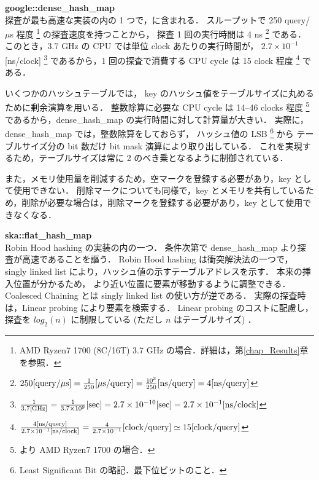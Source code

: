 {\bf google::dense\_hash\_map}
\samepage \\ \indent
探査が最も高速な実装の内の 1 つで，\cite{sparsehash2005}に含まれる．
スループットで 250 query/$\mu$s 程度
\footnote{AMD Ryzen7 1700 (8C/16T) 3.7 GHz の場合．詳細は，第\ref{chap_Results}章を参照．}
の探査速度を持つことから，
探査 1 回の実行時間は 4 ns
\footnote{
  $
    250{\rm [query \slash \mu s]}
    = \frac{1}{250} {\rm [\mu s \slash query]}
    = \frac{10^3}{250} {\rm [ns \slash query]}
    = 4 {\rm [ns \slash query]}
  $
}
である．このとき，3.7 GHz の CPU では単位 clock あたりの実行時間が，
$2.7 \times 10^{-1}$ [ns/clock]
\footnote{
  $
    \frac{1}{3.7 {\rm [GHz]}}
    = \frac{1}{3.7 \times 10^9}{\rm [sec]}
    = 2.7 \times 10^{-10}{\rm [sec]}
    = 2.7 \times 10^{-1}{\rm [ns/clock]}
  $
}
であるから，1 回の探査で消費する CPU cycle は
15 clock 程度
\footnote{
  $
    \frac{ 4 {\rm [ns/query]} }{ 2.7 \times 10^{-1} {\rm [ns/clock]} }
    = \frac{ 4 }{ 2.7 \times 10^{-1} } {\rm [clock/query]}
    \simeq 15 {\rm [clock/query]}
  $
}
である．

いくつかのハッシュテーブルでは，
key のハッシュ値をテーブルサイズに丸めるために剰余演算を用いる．
整数除算に必要な CPU cycle は 14--46 clocks 程度
\footnote{
  \cite{AgnerFog2018}より AMD Ryzen7 1700 の場合．
}
であるから，dense\_hash\_map の実行時間に対して計算量が大きい．
実際に，
dense\_hash\_map では，整数除算をしておらず，
ハッシュ値の LSB \footnote{Least Significant Bit の略記．最下位ビットのこと．} から
テーブルサイズ分の bit 数だけ bit mask 演算により取り出している．
これを実現するため，テーブルサイズは常に 2 のべき乗となるように制御されている．

また，メモリ使用量を削減するため，空マークを登録する必要があり，key として使用できない．
削除マークについても同様で，key とメモリを共有しているため，削除が必要な場合は，削除マークを登録する必要があり，key として使用できなくなる．

{\bf ska::flat\_hash\_map}
\samepage \\ \indent
Robin Hood hashing の実装の内の一つ．
条件次第で dense\_hash\_map より探査が高速であることを謳う．
Robin Hood hashing は衝突解決法の一つで，
singly linked list により，ハッシュ値の示すテーブルアドレスを示す．
本来の挿入位置が分かるため，
より近い位置に要素が移動するように調整できる．
Coalesced Chaining とは singly linked list の使い方が逆である．
実際の探査時は，Linear probing により要素を検索する．
Linear probing のコストに配慮し，
探査を $log_2(n)$ に制限している (ただし $n$ はテーブルサイズ) \citep{Skarupke2017}．

